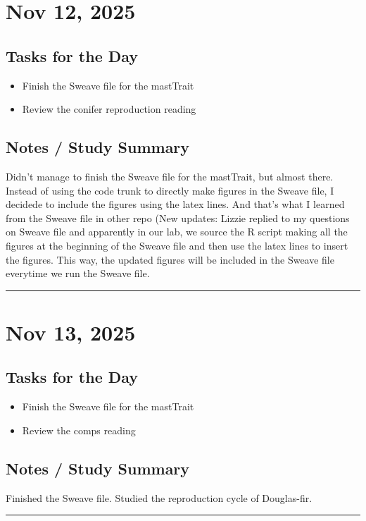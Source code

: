 \documentclass[12pt]{article}
\begin{document}
\section*{Nov 12, 2025}

\subsection*{Tasks for the Day}
\begin{itemize}
    \item Finish the Sweave file for the mastTrait
    \item Review the conifer reproduction reading
\end{itemize}
\subsection*{Notes / Study Summary}
Didn't manage to finish the Sweave file for the mastTrait, but almost there. Instead of using the code trunk to directly make figures in the Sweave file, I decidede to include the figures using the latex lines. And that's what I learned from the Sweave file in other repo (New updates: Lizzie replied to my questions on Sweave file and apparently in our lab, we source the R script making all the figures at the beginning of the Sweave file and then use the latex lines to insert the figures. This way, the updated figures will be included in the Sweave file everytime we run the Sweave file.
\vspace{1em}
\hrule
\vspace{1em}

\section*{Nov 13, 2025}

\subsection*{Tasks for the Day}
\begin{itemize}
    \item Finish the Sweave file for the mastTrait
    \item Review the comps reading
\end{itemize}
\subsection*{Notes / Study Summary}
Finished the Sweave file. Studied the reproduction cycle of Douglas-fir. 
\vspace{1em}
\hrule
\vspace{1em}
\end{document}
